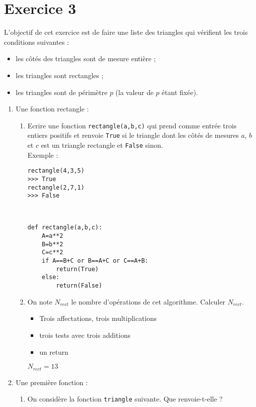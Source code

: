 \documentclass[a4paper,12pt]{article}
\begin{document}
\section*{Exercice 3}
\noi L'objectif de cet exercice est de faire une liste des triangles qui v\' erifient les trois conditions suivantes :
\begin{itemize}
\item les c\^ ot\' es des triangles sont de mesure enti\` ere ;
\item les triangles sont rectangles ;
\item les triangles sont de p\' erim\` etre $p$ (la valeur de $p$ \' etant fix\' ee).
\end{itemize}
\begin{enumerate}
\newpage
\item Une fonction rectangle :
\begin{enumerate}
\item Ecrire une fonction \verb?rectangle(a,b,c)? qui prend comme entr\' ee trois entiers positifs et renvoie \verb?True? si le triangle dont les c\^ ot\' es de mesures $a$, $b$ et $c$ est un triangle rectangle et \verb?False? sinon.\\
Exemple : 
\begin{verbatim}
rectangle(4,3,5)
>>> True
rectangle(2,7,1)
>>> False
\end{verbatim}
\begin{solution}~\\
\begin{verbatim}
def rectangle(a,b,c):
    A=a**2
    B=b**2
    C=c**2
    if A==B+C or B==A+C or C==A+B:
        return(True)
    else:
        return(False)
\end{verbatim}
\end{solution}
\item On note $N_{rect}$ le nombre d'op\' erations de cet algorithme. Calculer $N_{rect}$.
\begin{solution}
\begin{itemize}
\item Trois affectations, trois multiplications
\item trois tests avec trois additions
\item un return 
\end{itemize}
$N_{rect}=13$
\end{solution}
\end{enumerate}
\item Une premi\` ere fonction :
\begin{enumerate}
\item On consid\` ere la fonction \verb?triangle? suivante. Que renvoie-t-elle ?

\end{enumerate}
\end{enumerate}
\end{document}
